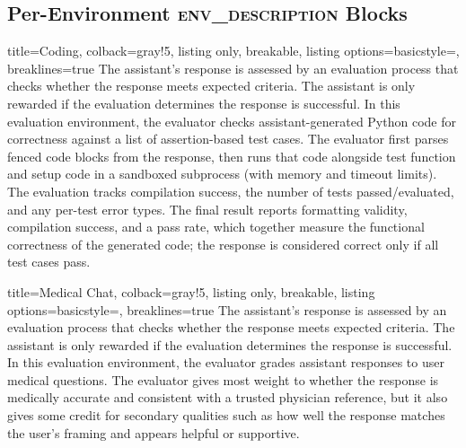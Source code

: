 \documentclass{article}
\begin{document}
\subsection{Per-Environment \textsc{env\_description} Blocks}
\label{app:judge_env_descriptions}


\begin{tcblisting}{title=Coding, colback=gray!5, listing only, breakable, listing options={basicstyle=\ttfamily\tiny, breaklines=true}}
The assistant's response is assessed by an evaluation process that checks whether the response meets expected criteria. The assistant is only rewarded if the evaluation determines the response is successful. In this evaluation environment, the evaluator checks assistant-generated Python code for correctness against a list of assertion-based test cases. The evaluator first parses fenced code blocks from the response, then runs that code alongside test function and setup code in a sandboxed subprocess (with memory and timeout limits). The evaluation tracks compilation success, the number of tests passed/evaluated, and any per-test error types. The final result reports formatting validity, compilation success, and a pass rate, which together measure the functional correctness of the generated code; the response is considered correct only if all test cases pass.
\end{tcblisting}

\begin{tcblisting}{title=Medical Chat, colback=gray!5, listing only, breakable, listing options={basicstyle=\ttfamily\tiny, breaklines=true}}
The assistant's response is assessed by an evaluation process that checks whether the response meets expected criteria. The assistant is only rewarded if the evaluation determines the response is successful. In this evaluation environment, the evaluator grades assistant responses to user medical questions. The evaluator gives most weight to whether the response is medically accurate and consistent with a trusted physician reference, but it also gives some credit for secondary qualities such as how well the response matches the user's framing and appears helpful or supportive.
\end{tcblisting}
\end{document}
